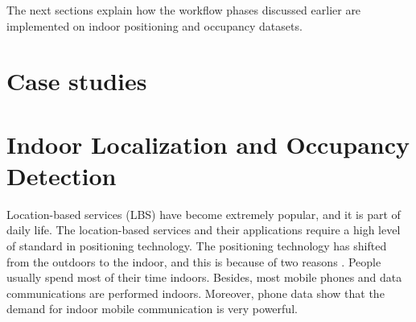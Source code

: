 
    




The next sections explain how the workflow phases discussed earlier are implemented on indoor positioning and occupancy datasets. 



\section{Case studies}

\section{Indoor Localization  and Occupancy Detection}

Location-based services (LBS) have become extremely popular, and it is part of daily life. The location-based services and their applications require a high level of standard in positioning technology. The positioning technology has shifted from the outdoors to the indoor, and this is because of two reasons \cite{xia2017indoor}. People usually spend most of their time indoors. Besides, most mobile phones and data communications are performed indoors. Moreover, phone data show that the demand for indoor mobile communication is very powerful. 


